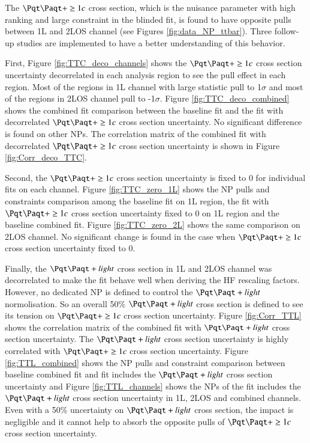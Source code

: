 The $\ttbar+\ge 1c$ cross section, which is the nuisance parameter with high ranking and large constraint in the blinded fit, is found to have opposite pulls between 1L and 2LOS channel (see Figures \ref{fig:data_NP_ttbar}). Three follow-up studies are implemented to have a better understanding of this behavior.

First, Figure \ref{fig:TTC_deco_channels} shows the $\ttbar+\ge 1c$ cross section uncertainty decorrelated in each analysis region to see the pull effect in each region. Most of the regions in 1L channel with large statistic pull to 1$\sigma$ and most of the regions in 2LOS channel pull to -1$\sigma$. Figure \ref{fig:TTC_deco_combined} shows the combined fit comparison between the baseline fit and the fit with decorrelated $\ttbar+\ge 1c$ cross section uncertainty. No significant difference is found on other NPs. The correlation matrix of the combined fit with decorrelated $\ttbar+\ge 1c$ cross section uncertainty is shown in Figure \ref{fig:Corr_deco_TTC}.

Second, the $\ttbar+\ge 1c$ cross section uncertainty is fixed to 0 for individual fits on each channel. Figure \ref{fig:TTC_zero_1L} shows the NP pulls and constraints comparison among the baseline fit on 1L region, the fit with $\ttbar+\ge 1c$ cross section uncertainty fixed to 0 on 1L region and the baseline combined fit. Figure \ref{fig:TTC_zero_2L} shows the same comparison on 2LOS channel. No significant change is found in the case when $\ttbar+\ge 1c$ cross section uncertainty fixed to 0.

Finally, the $\ttbar+light$ cross section in 1L and 2LOS channel was decorrelated to make the fit behave well when deriving the HF rescaling factors. However, no dedicated NP is defined to control the $\ttbar+light$ normolisation. So an overall 50\% $\ttbar+light$ cross section is defined to see its tension on $\ttbar+\ge 1c$ cross section uncertainty. Figure \ref{fig:Corr_TTL} shows the correlation matrix of the combined fit with $\ttbar+light$ cross section uncertainty. The $\ttbar+light$ cross section uncertainty is highly correlated with $\ttbar+\ge 1c$ cross section uncertainty. Figure \ref{fig:TTL_combined} shows the NP pulls and constraint comparison between baseline combined fit and fit includes the $\ttbar+light$ cross section uncertainty and Figure \ref{fig:TTL_channels} shows the NPs of the fit includes the $\ttbar+light$ cross section uncertainty in 1L, 2LOS and combined channels. Even with a 50\% uncertainty on $\ttbar+light$ cross section, the impact is negligible and it cannot help to absorb the opposite pulls of $\ttbar+\ge 1c$ cross section uncertainty.

